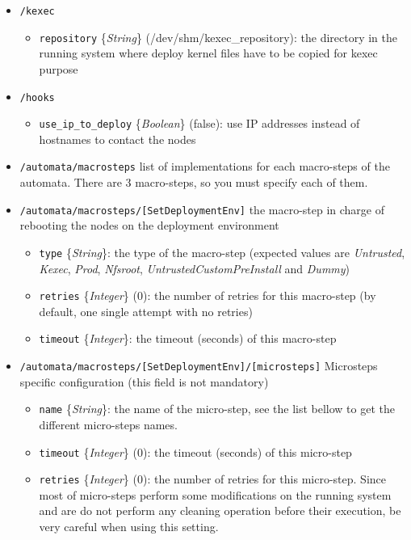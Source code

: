\documentclass[a4wide,10pt,oneside]{book}
\newcommand{\ypath}[1]{\texttt{#1}}
\newcommand{\yfield}[2]{\texttt{#1} {\small\{{\emph{#2}}\}}:}
\newcommand{\yfieldd}[3]{\texttt{#1} {\small\{{\emph{#2}}\}} {\small(}#3{\small)}:}
\begin{document}
\begin{itemize}
  \item \ypath{/kexec}
  \begin{itemize}
    \item \yfieldd{repository}{String}{/dev/shm/kexec\_repository} the directory in the running system where deploy kernel files have to be copied for kexec purpose
  \end{itemize}

  \item \ypath{/hooks}
  \begin{itemize}
    \item \yfieldd{use\_ip\_to\_deploy}{Boolean}{false} use IP addresses instead of hostnames to contact the nodes
  \end{itemize}

  \item \ypath{/automata/macrosteps} list of implementations for each macro-steps of the automata. There are 3 macro-steps, so you must specify each of them.
  \item \ypath{/automata/macrosteps/[SetDeploymentEnv]} the macro-step in charge of rebooting the nodes on the deployment environment
  \begin{itemize}
    \item \yfield{type}{String} the type of the macro-step (expected values are \emph{Untrusted}, \emph{Kexec}, \emph{Prod}, \emph{Nfsroot}, \emph{UntrustedCustomPreInstall} and \emph{Dummy})
    \item \yfieldd{retries}{Integer}{0} the number of retries for this macro-step (by default, one single attempt with no retries)
    \item \yfield{timeout}{Integer} the timeout (seconds) of this macro-step
  \end{itemize}
  \item \ypath{/automata/macrosteps/[SetDeploymentEnv]/[microsteps]} Microsteps specific configuration (this field is not mandatory)
  \begin{itemize}
    \item \yfield{name}{String} the name of the micro-step, see the list bellow to get the different micro-steps names.
    \item \yfieldd{timeout}{Integer}{0} the timeout (seconds) of this micro-step
    \item \yfieldd{retries}{Integer}{0} the number of retries for this micro-step. Since most of micro-steps perform some modifications on the running system and are do not perform any cleaning operation before their execution, be very careful when using this setting.

\end{itemize}
\end{itemize}
\end{document}
